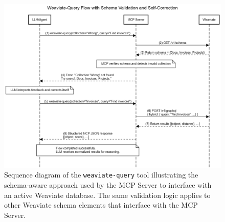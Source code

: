 \begin{figure}
    \centering
    \includegraphics[width=1\linewidth]{Images/Sequence-diagram-Weaviate-Query.png}
   \caption{Sequence diagram of the \texttt{weaviate-query} tool illustrating the schema-aware approach used by the MCP Server to interface with an active Weaviate database. The same validation logic applies to other Weaviate schema elements that interface with the MCP Server.}
    \label{fig:sequence-diagram-weaviate-query}
\end{figure}

